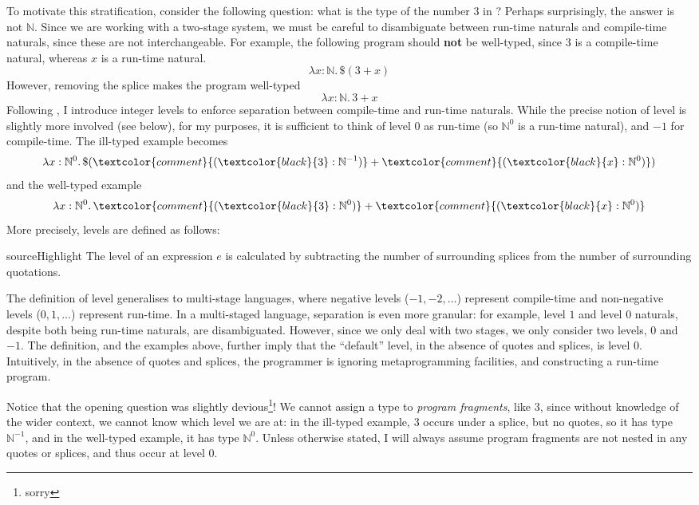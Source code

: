   To motivate this stratification, consider the following question: what is the type of the number $3$ in \sourceLang{}? Perhaps surprisingly, the answer is not $\mathbb{N}$. Since we are working with a two-stage system, we must be careful to disambiguate between run-time naturals and compile-time naturals, since these are not interchangeable. For example, the following program should \textbf{not} be well-typed, since $3$ is a compile-time natural, whereas $x$ is a run-time natural. 
  \[\lambda x: \mathbb{N}. \, \$(3 + x)\]
  However, removing the splice makes the program well-typed
  \[\lambda x: \mathbb{N}. \, 3 + x\]
  Following \citet{xie-2023}, I introduce integer levels to enforce separation between compile-time and run-time naturals. While the precise notion of level is slightly more involved (see below), for my purposes, it is sufficient to think of level $0$ as run-time (so $\mathbb{N}^0$ is a run-time natural), and $-1$ for compile-time. The ill-typed example becomes
  \[\lambda x: \mathbb{N}^0. \, \$(\textcolor{comment}{(\textcolor{black}{3}:\mathbb{N}^{-1})} + \textcolor{comment}{(\textcolor{black}{x}:\mathbb{N}^{0})})\]
  and the well-typed example 
  \[\lambda x: \mathbb{N}^0. \, \textcolor{comment}{(\textcolor{black}{3}:\mathbb{N}^{0})} + \textcolor{comment}{(\textcolor{black}{x}:\mathbb{N}^{0})}\]
  More precisely, levels are defined as follows:

  \begin{definition}[Level]{sourceHighlight}
    The level of an expression $e$ is calculated by subtracting the number of surrounding splices from the number of surrounding quotations.
  \end{definition}

  The definition of level generalises to multi-stage languages, where negative levels ($-1, -2, \ldots$) represent compile-time and non-negative levels ($0, 1, \ldots$) represent run-time. In a multi-staged language, separation is even more granular: for example, level $1$ and level $0$ naturals, despite both being run-time naturals, are disambiguated. However, since we only deal with two stages, we only consider two levels, $0$ and $-1$. The definition, and the examples above, further imply that the ``default'' level, in the absence of quotes and splices, is level $0$. Intuitively, in the absence of quotes and splices, the programmer is ignoring metaprogramming facilities, and constructing a run-time program. 


  Notice that the opening question was slightly devious\footnote{sorry}! We cannot assign a type to \textit{program fragments}, like $3$, since without knowledge of the wider context, we cannot know which level we are at: in the ill-typed example, $3$ occurs under a splice, but no quotes, so it has type $\mathbb{N}^{-1}$, and in the well-typed example, it has type $\mathbb{N}^0$. Unless otherwise stated, I will always assume program fragments are not nested in any quotes or splices, and thus occur at level $0$.

